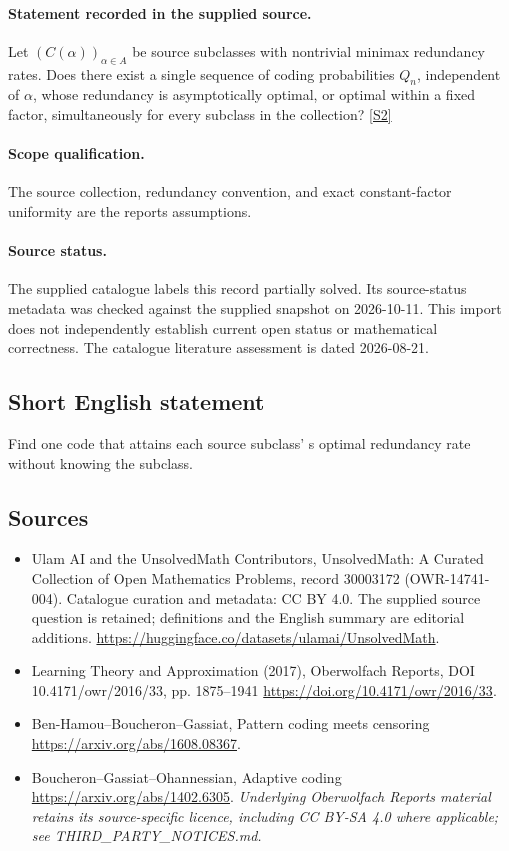 \documentclass[11pt]{article}
\begin{document}
\paragraph{Statement recorded in the supplied source.}
Let $(C(\alpha))_{\alpha\in A}$ be source subclasses with nontrivial minimax redundancy rates. Does there exist a single sequence of coding probabilities $Q_n$, independent of $\alpha$, whose redundancy is asymptotically optimal, or optimal within a fixed factor, simultaneously for every subclass in the collection? \href{https://doi.org/10.4171/owr/2016/33}{[S2]}
\paragraph{Scope qualification.}
The source collection, redundancy convention, and exact constant-factor uniformity are the report\textquotesingle s assumptions.
\paragraph{Source status.}
The supplied catalogue labels this record partially solved. Its source-status metadata was checked against the supplied snapshot on 2026-10-11. This import does not independently establish current open status or mathematical correctness. The catalogue literature assessment is dated 2026-08-21.
\subsection{Short English statement}
Find one code that attains each source subclass' s optimal redundancy rate without knowing the subclass.
\subsection{Sources}
\begin{itemize}
\item[S1] Ulam AI and the UnsolvedMath Contributors, UnsolvedMath: A Curated Collection of Open Mathematics Problems, record 30003172 (OWR-14741-004). Catalogue curation and metadata: CC BY 4.0. The supplied source question is retained; definitions and the English summary are editorial additions.
\url{https://huggingface.co/datasets/ulamai/UnsolvedMath}.
\item[S2] Learning Theory and Approximation (2017), Oberwolfach Reports, DOI 10.4171/owr/2016/33, pp. 1875--1941
\url{https://doi.org/10.4171/owr/2016/33}.
\item[S3] Ben-Hamou--Boucheron--Gassiat, Pattern coding meets censoring
\url{https://arxiv.org/abs/1608.08367}.
\item[S4] Boucheron--Gassiat--Ohannessian, Adaptive coding
\url{https://arxiv.org/abs/1402.6305}.
\textit{Underlying Oberwolfach Reports material retains its source-specific licence, including CC BY-SA 4.0 where applicable; see THIRD\_PARTY\_NOTICES.md.}
\end{itemize}
\end{document}
